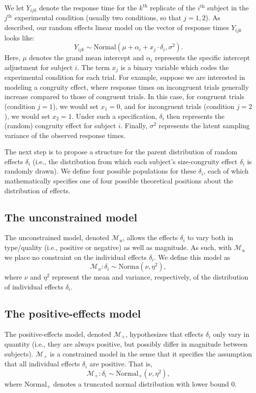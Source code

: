 \documentclass[12pt,twoside,a4paper]{article}
\begin{document}
We let \(Y_{ijk}\) denote the response time for the \(k^{\text{th}}\) replicate of the \(i^{\text{th}}\) subject in the \(j^{\text{th}}\) experimental condition (usually two conditions, so that \(j=1,2\)). As described, our random effects linear model on the vector of response times \(Y_{ijk}\) looks like:
\[
Y_{ijk} \sim \text{Normal}(\mu + \alpha_i + x_j\cdot \delta_i, \sigma^2).
\]
Here, \(\mu\) denotes the grand mean intercept and \(\alpha_i\) represents the specific intercept adjustment for subject \(i\). The term \(x_j\) is a binary variable which codes the experimental condition for each trial. For example, suppose we are interested in modeling a congruity effect, where response times on incongruent trials generally increase compared to those of congruent trials. In this case, for congruent trials (condition \(j=1\)), we would set \(x_1=0\), and for incongruent trials (condition \(j=2\)), we would set \(x_2=1\). Under such a specification, \(\delta_i\) then represents the (random) congruity effect for subject \(i\). Finally, \(\sigma^2\) represents the latent sampling variance of the observed response times.

The next step is to propose a structure for the parent distribution of random effects \(\delta_i\) (i.e., the distribution from which each subject's size-congruity effect \(\delta_i\) is randomly drawn). We define four possible populations for these \(\delta_i\), each of which mathematically specifies one of four possible theoretical positions about the distribution of effects.

\subsection{The unconstrained model}

The unconstrained model, denoted \(\mathcal{M}_u\), allows the effects \(\delta_i\) to vary both in type/quality (i.e., positive or negative) as well as magnitude. As such, with \(\mathcal{M}_u\) we place no constraint on the individual effects \(\delta_i\). We define this model as
\[
\mathcal{M}_u: \delta_i \sim \text{Norma}(\nu, \eta^2),
\]
where \(\nu\) and \(\eta^2\) represent the mean and variance, respectively, of the distribution of individual effects \(\delta_i\).

\subsection{The positive-effects model}

The positive-effects model, denoted \(\mathcal{M}_+\), hypothesizes that effects \(\delta_i\) only vary in quantity (i.e., they are always positive, but possibly differ in magnitude between subjects). \(\mathcal{M}_+\) is a constrained model in the sense that it specifies the assumption that all individual effects \(\delta_i\) are positive. That is,
\[
\mathcal{M}_+:\delta_i \sim \text{Normal}_+(\nu,\eta^2),
\]
where \(\text{Normal}_+\) denotes a truncated normal distribution with lower bound 0.
\end{document}
